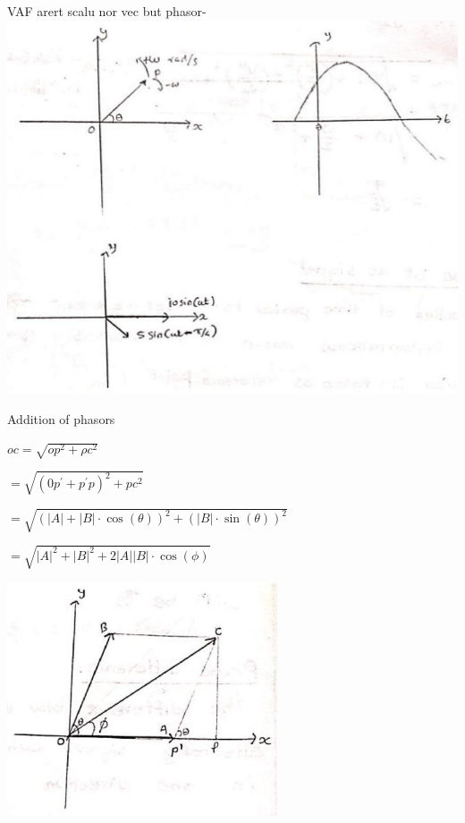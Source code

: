 \documentclass[12pt, a4paper]{article}
\newcommand{\figwidth}{8cm}
\begin{document}
	VAF arert scalu nor vec but phasor-\\
	\includegraphics[max width=\textwidth, center]{2024_06_15_74bbabba7981675b0d49g-03(3)}

	Addition of phasors

$o c=\sqrt{o p^{2}+\rho c^{2}}$

$=\sqrt{\left(0 p^{\prime}+p^{\prime} p\right)^{2}+p c^{2}}$

$=\sqrt{(|A|+|B| \cdot \cos (\theta))^{2}+(|B| \cdot \sin (\theta))^{2}}$

$=\sqrt{|A|^{2}+|B|^{2}+2|A||B| \cdot \cos (\phi)}$

	\begin{center}
		\includegraphics[max width=\figwidth]{2024_06_15_74bbabba7981675b0d49g-03(1)}
	\end{center}
\end{document}
